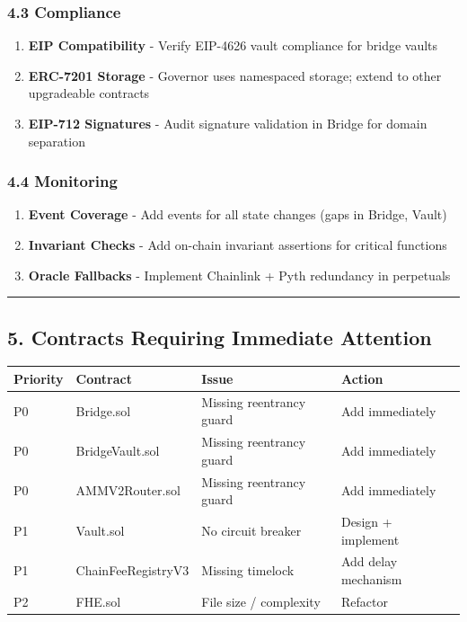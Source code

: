 \documentclass[
]{article}
\newcounter{none} %
\providecommand{\tightlist}{%
  \setlength{\itemsep}{0pt}\setlength{\parskip}{0pt}}
\begin{document}
\subsubsection{4.3 Compliance}\label{43-compliance}

\begin{enumerate}
\def\labelenumi{\arabic{enumi}.}
\tightlist
\item
  \textbf{EIP Compatibility} - Verify EIP-4626 vault compliance for
  bridge vaults
\item
  \textbf{ERC-7201 Storage} - Governor uses namespaced storage; extend
  to other upgradeable contracts
\item
  \textbf{EIP-712 Signatures} - Audit signature validation in Bridge for
  domain separation
\end{enumerate}

\subsubsection{4.4 Monitoring}\label{44-monitoring}

\begin{enumerate}
\def\labelenumi{\arabic{enumi}.}
\tightlist
\item
  \textbf{Event Coverage} - Add events for all state changes (gaps in
  Bridge, Vault)
\item
  \textbf{Invariant Checks} - Add on-chain invariant assertions for
  critical functions
\item
  \textbf{Oracle Fallbacks} - Implement Chainlink + Pyth redundancy in
  perpetuals
\end{enumerate}

\begin{center}\rule{0.5\linewidth}{0.5pt}\end{center}

\subsection{5. Contracts Requiring Immediate
Attention}\label{5-contracts-requiring-immediate-attention}

{\def\LTcaptype{none} %
\begin{longtable}[]{@{}llll@{}}
\toprule\noalign{}
Priority & Contract & Issue & Action \\
\midrule\noalign{}
\endhead
\bottomrule\noalign{}
\endlastfoot
P0 & Bridge.sol & Missing reentrancy guard & Add immediately \\
P0 & BridgeVault.sol & Missing reentrancy guard & Add immediately \\
P0 & AMMV2Router.sol & Missing reentrancy guard & Add immediately \\
P1 & Vault.sol & No circuit breaker & Design + implement \\
P1 & ChainFeeRegistryV3 & Missing timelock & Add delay mechanism \\
P2 & FHE.sol & File size / complexity & Refactor \\
\end{longtable}
}
\end{document}
